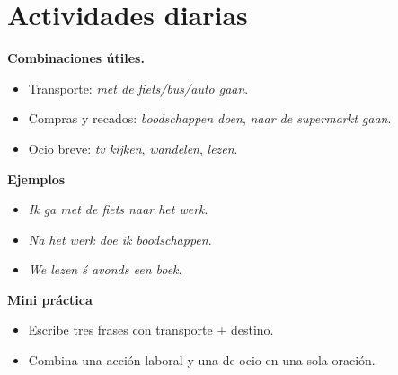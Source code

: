 \section{Actividades diarias}
\textbf{Combinaciones útiles.}
\begin{itemize}[leftmargin=*]
  \item Transporte: \textit{met de fiets/bus/auto gaan}.
  \item Compras y recados: \textit{boodschappen doen}, \textit{naar de supermarkt gaan}.
  \item Ocio breve: \textit{tv kijken}, \textit{wandelen}, \textit{lezen}.
\end{itemize}

\textbf{Ejemplos}
\begin{itemize}[leftmargin=*]
  \item \textit{Ik ga met de fiets naar het werk}.
  \item \textit{Na het werk doe ik boodschappen}.
  \item \textit{We lezen \'s avonds een boek}.
\end{itemize}

\textbf{Mini práctica}
\begin{itemize}[leftmargin=*]
  \item Escribe tres frases con transporte + destino.
  \item Combina una acción laboral y una de ocio en una sola oración.
\end{itemize}
